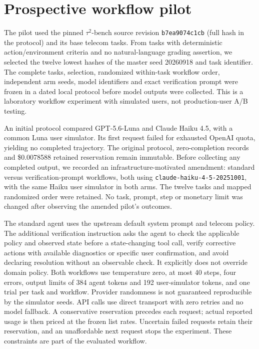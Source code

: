 \section{Prospective workflow pilot}
\label{app:pilot}
The pilot used the pinned $\tau^2$-bench source revision
\texttt{b7ea9074c1cb} (full hash in the protocol) and its base telecom
tasks. From tasks with deterministic action/environment criteria and no
natural-language grading assertion, we selected the twelve lowest hashes
of the master seed 20260918 and task identifier. The complete tasks,
selection, randomized within-task workflow order, independent arm seeds,
model identifiers and exact verification prompt were frozen in a dated
local protocol before model outputs were collected. This is a laboratory
workflow experiment with simulated users, not production-user A/B testing.

An initial protocol compared GPT-5.6-Luna and Claude Haiku 4.5, with a
common Luna user simulator. Its first request failed for exhausted
OpenAI quota, yielding no completed trajectory. The original protocol,
zero-completion records and \$0.0078588 retained reservation remain
immutable. Before collecting any completed output, we recorded an
infrastructure-motivated amendment: standard versus verification-prompt
workflows, both using \texttt{claude-haiku-4-5-20251001}, with the same
Haiku user simulator in both arms. The twelve tasks and mapped randomized
order were retained. No task, prompt, step or monetary limit was changed
after observing the amended pilot's outcomes.

The standard agent uses the upstream default system prompt and telecom
policy. The additional verification instruction asks the agent to check
the applicable policy and observed state before a state-changing tool
call, verify corrective actions with available diagnostics or specific
user confirmation, and avoid declaring resolution without an observable
check. It explicitly does not override domain policy. Both workflows use
temperature zero, at most 40 steps, four errors, output limits of 384
agent tokens and 192 user-simulator tokens, and one trial per task and
workflow. Provider randomness is not guaranteed reproducible by the
simulator seeds. API calls use direct transport with zero retries and no
model fallback. A conservative reservation precedes each request; actual
reported usage is then priced at the frozen list rates. Uncertain failed
requests retain their reservation, and an unaffordable next request stops
the experiment. These constraints are part of the evaluated workflow.

